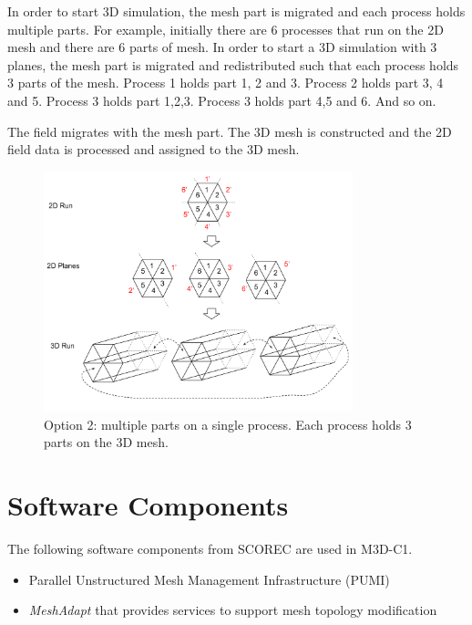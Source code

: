 \documentclass[11pt]{article}  %
\begin{document}
\begin{itemize}
In order to start 3D simulation,  the mesh part is migrated and each process holds multiple parts. For example, initially there are 6 processes that run on the 2D mesh and there are 6 parts of mesh. In order to start a 3D simulation with 3 planes, the mesh part is migrated and redistributed such that each process holds 3 parts of the mesh. Process 1 holds part 1, 2 and 3. Process 2 holds part 3, 4 and 5. Process 3 holds part 1,2,3. Process 3 holds part 4,5 and 6. And so on.

The field migrates with the mesh part.  The  3D mesh is constructed and the 2D field data is processed and assigned to the 3D mesh. 

\begin{figure}[htb]
\center
\includegraphics[width=0.8\textwidth]{fig/wedgePlane2.png}
\caption{Option 2: multiple parts on a single process. Each process holds 3 parts on the 3D mesh.} \label{fig:wedgePlane2}
\end{figure}
\end{itemize}

\clearpage


\clearpage
\appendix
\section{Software Components}
The following software components from SCOREC are used in M3D-C1.
\begin{itemize}
\item  Parallel Unstructured Mesh Management Infrastructure (PUMI) \cite{pumi-web-page}
\item \emph{MeshAdapt} that  provides services to support mesh topology modification
\end{itemize}
\end{document}
